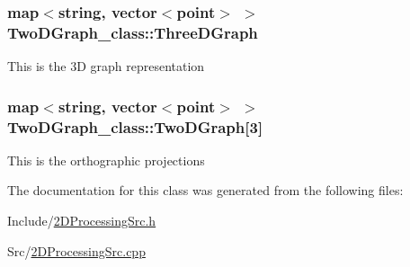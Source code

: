 \subsubsection[{\texorpdfstring{Three\+D\+Graph}{ThreeDGraph}}]{\setlength{\rightskip}{0pt plus 5cm}map$<$string, vector$<${\bf point}$>$ $>$ Two\+D\+Graph\+\_\+class\+::\+Three\+D\+Graph}\hypertarget{classTwoDGraph__class_a6b9cd70ed1be50fb248b56f6da30a3c5}{}\label{classTwoDGraph__class_a6b9cd70ed1be50fb248b56f6da30a3c5}
This is the 3D graph representation 
\subsubsection[{\texorpdfstring{Two\+D\+Graph}{TwoDGraph}}]{\setlength{\rightskip}{0pt plus 5cm}map$<$string, vector$<${\bf point}$>$ $>$ Two\+D\+Graph\+\_\+class\+::\+Two\+D\+Graph\mbox{[}3\mbox{]}}\hypertarget{classTwoDGraph__class_aab69ccead28f685a9e084f52e1488354}{}\label{classTwoDGraph__class_aab69ccead28f685a9e084f52e1488354}
This is the orthographic projections 

The documentation for this class was generated from the following files\+:\begin{DoxyCompactItemize}
\item 
Include/\hyperlink{2DProcessingSrc_8h}{2\+D\+Processing\+Src.\+h}\item 
Src/\hyperlink{2DProcessingSrc_8cpp}{2\+D\+Processing\+Src.\+cpp}\end{DoxyCompactItemize}
